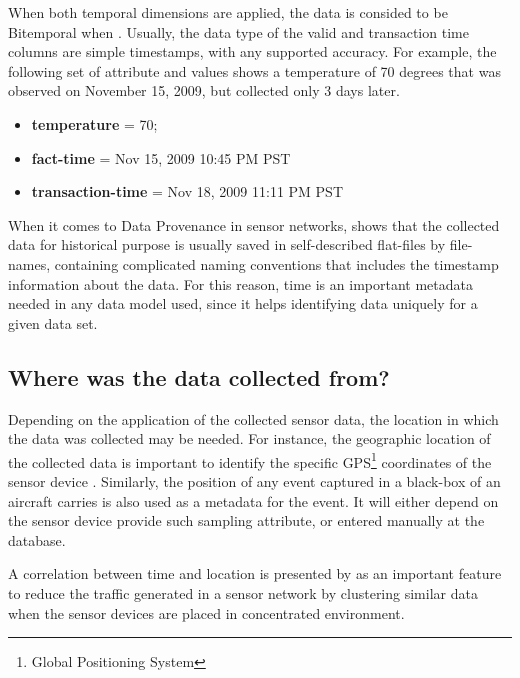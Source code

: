 When both temporal dimensions are applied, the data is consided to be 
Bitemporal when \cite{db-temporal}. Usually, the data type of the valid and
transaction time columns are simple timestamps, with any supported accuracy.
For example, the following set of attribute and values shows a temperature of
70 degrees that was observed on November 15, 2009, but collected only 3 days
later.

\begin{itemize}
  \item \textbf{temperature} = 70;
  \item \textbf{fact-time} = Nov 15, 2009 10:45 PM PST
  \item \textbf{transaction-time} = Nov 18, 2009 11:11 PM PST
\end{itemize}

When it comes to Data Provenance in sensor networks, \cite{sn-provenance}
shows that the collected data for historical purpose is usually saved in
self-described flat-files by file-names, containing complicated naming
conventions that includes the timestamp information about the data. For this
reason, time is an important metadata needed in any data model used, since it 
helps identifying data uniquely for a given data set.

\subsection{Where was the data collected from?}

Depending on the application of the collected sensor data, the location in
which the data was collected may be needed. For instance, the geographic
location of the collected data is important to identify the specific
GPS\footnote{Global Positioning System} coordinates of the sensor device
\cite{sn-ex02}. Similarly, the position of any event captured in a black-box of
an aircraft carries is also used as a metadata for the event. It will either
depend on the sensor device provide such sampling attribute, or entered
manually at the database.

A correlation between time and location is presented by \cite{sn-time-series}
as an important feature to reduce the traffic generated in a sensor network by
clustering similar data when the sensor devices are placed in concentrated
environment.